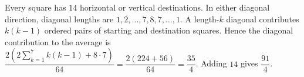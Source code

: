 Every square has $14$ horizontal or vertical destinations. In either diagonal direction, diagonal lengths are $1,2,\ldots,7,8,7,\ldots,1$. A length-$k$ diagonal contributes $k(k-1)$ ordered pairs of starting and destination squares. Hence the diagonal contribution to the average is $\dfrac{2\left(2\sum_{k=1}^7k(k-1)+8\cdot7\right)}{64}=\dfrac{2(224+56)}{64}=\dfrac{35}{4}$. Adding $14$ gives $\boxed{\dfrac{91}{4}}$.
